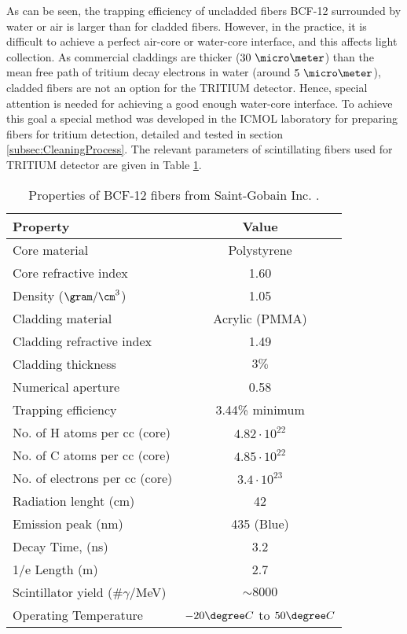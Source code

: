 As can be seen, the trapping efficiency of uncladded fibers BCF-12 surrounded by water or air is larger than for cladded fibers. However, in the practice, it is difficult to achieve a perfect air-core or water-core interface, and this affects light collection. As commercial claddings are thicker ($30~\micro \meter$) than the mean free path of tritium decay electrons in water (around $5~\micro\meter$), cladded fibers are not an option for the TRITIUM detector. Hence, special attention is needed for achieving a good enough water-core interface. To achieve this goal a special method was developed in the ICMOL laboratory for preparing fibers for tritium detection, detailed and tested in section \ref{subsec:CleaningProcess}. The relevant parameters of scintillating fibers used for TRITIUM detector are given in Table \ref{tab:ParametersFibersBCF12}.

\begin{table}[htbp]
\centering{}%
\begin{tabular}{lc}
\toprule 
Property & Value \tabularnewline
\midrule
\midrule 
Core material & Polystyrene \tabularnewline
Core refractive index & 1.60 \tabularnewline
Density ($\gram/\cm^3$) & 1.05 \tabularnewline
Cladding material & Acrylic (PMMA) \tabularnewline
Cladding refractive index & 1.49 \tabularnewline
Cladding thickness & $3\%$ \tabularnewline
Numerical aperture & 0.58 \tabularnewline
Trapping efficiency & 3.44\% minimum \tabularnewline
No. of H atoms per cc (core) & $4.82 \cdot{} 10^{22}$ \tabularnewline
No. of C atoms per cc (core) & $4.85 \cdot{} 10^{22}$ \tabularnewline
No. of electrons per cc (core) & $3.4 \cdot{} 10^{23}$ \tabularnewline
Radiation lenght (cm) & 42 \tabularnewline
Emission peak (nm) & 435 (Blue) \tabularnewline
Decay Time, (ns) & 3.2 \tabularnewline
1/e Length (m) & 2.7 \tabularnewline
Scintillator yield (\#$\gamma$/MeV) & $\sim 8000$ \tabularnewline
Operating Temperature & $-20\degree C$ to $50\degree C$ \tabularnewline
\bottomrule
\end{tabular}
\caption{Properties of BCF-12 fibers from Saint-Gobain Inc. \cite{DataSheetBCF12Fiber}.}
\label{tab:ParametersFibersBCF12}
\end{table}